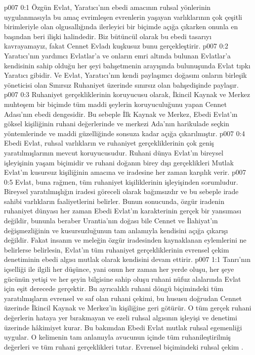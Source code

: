 \vs p007 0:1 Özgün Evlat, Yaratıcı’nın ebedi amacının ruhsal yönlerinin uygulanmasıyla bu amaç evrimleşen evrenlerin yaşayan varlıklarının çok çeşitli birimleriyle olan olgusallığında ilerleyici bir biçimde açığa çıkarken onunla en başından beri ilişki halindedir. Biz bütüncül olarak bu ebedi tasarıyı kavrayamayız, fakat Cennet Evladı kuşkusuz bunu gerçekleştirir.
\vs p007 0:2 Yaratıcı’nın yardımcı Evlatlar’a ve onların emri altında bulunan Evlatlar’a kendisinin sahip olduğu her şeyi bahşetmenin arayışında bulunuşunda Evlat tıpkı Yaratıcı gibidir. Ve Evlat, Yaratıcı’nın kendi paylaşımcı doğasını onların birleşik yöneticisi olan Sınırsız Ruhaniyet üzerinde sınırsız olan bahşedişinde paylaşır.
\vs p007 0:3 Ruhaniyet gerçekliklerinin koruyucusu olarak, İkincil Kaynak ve Merkez muhteşem bir biçimde tüm maddi şeylerin koruyuculuğunu yapan Cennet Adası’nın ebedi dengesidir. Bu sebeple İlk Kaynak ve Merkez, Ebedi Evlat’ın göksel kişiliğinin ruhani değerlerinde ve merkezi Ada’nın harikulade seçkin yöntemlerinde ve maddi güzelliğinde sonsuza kadar açığa çıkarılmıştır.
\vs p007 0:4 Ebedi Evlat, ruhsal varlıkların ve ruhaniyet gerçekliklerinin çok geniş yaratılmışlarının mevcut koruyucusudur. Ruhani dünya Evlat’ın bireysel işleyişinin yaşam biçimidir ve ruhani doğanın birey dışı gerçeklikleri Mutlak Evlat’ın kusursuz kişiliğinin amacına ve iradesine her zaman karşılık verir.
\vs p007 0:5 Evlat, buna rağmen, tüm ruhaniyet kişiliklerinin işleyişinden sorumludur. Bireysel yaratılmışlığın iradesi göreceli olarak bağımsızdır ve bu sebeple irade sahibi varlıkların faaliyetlerini belirler. Bunun sonucunda, özgür iradenin ruhaniyet dünyası her zaman Ebedi Evlat’ın karakterinin gerçek bir yansıması değildir, bununla beraber Urantia’nın doğası bile Cennet ve İlahiyat’ın değişmezliğinin ve kusursuzluğunun tam anlamıyla kendisini açığa çıkarışı değildir. Fakat insanın ve meleğin özgür iradesinden kaynaklanan eylemlerini ne belirlerse belirlesin, Evlat’ın tüm ruhaniyet gerçekliklerinin evrensel çekim denetiminin ebedi algısı mutlak olarak kendisini devam ettirir.
\vs p007 1:1 Tanrı’nın içselliği ile ilgili her düşünce, yani onun her zaman her yerde oluşu, her şeye gücünün yetişi ve her şeyin bilgisine sahip oluşu ruhani nüfuz alalarında Evlat için eşit derecede gerçektir. Bu ayrıcalıklı ruhani döngü biçimindeki tüm yaratılmışların evrensel ve saf olan ruhani çekimi, bu hususu doğrudan Cennet üzerinde İkincil Kaynak ve Merkez’in kişiliğine geri götürür. O tüm gerçek ruhani değerlerin hataya yer bırakmayan ve ezeli ruhsal algısının işleyişi ve denetimi üzerinde hâkimiyet kurar. Bu bakımdan Ebedi Evlat mutlak ruhsal egemenliği uygular. O kelimenin tam anlamıyla avucunun içinde tüm ruhanileştirilmiş değerleri ve tüm ruhani gerçeklikleri tutar. Evrensel biçimindeki ruhsal çekim .
